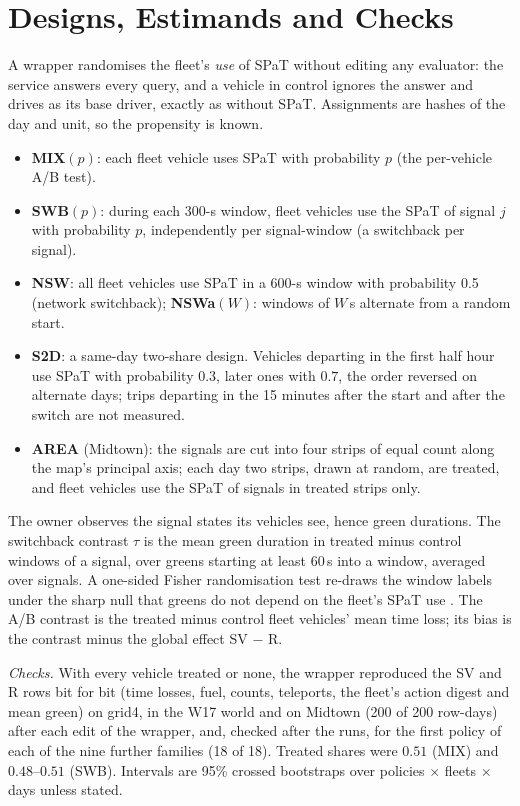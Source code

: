 \section{Designs, Estimands and Checks}\label{sec:design}
A wrapper randomises the fleet's \emph{use} of SPaT without editing any evaluator: the service answers every query, and a vehicle in
control ignores the answer and drives as its base driver, exactly as without SPaT. Assignments are hashes of the day and unit, so the
propensity is known.
\begin{itemize}\setlength\itemsep{1pt}
\item \textbf{MIX}$(p)$: each fleet vehicle uses SPaT with probability $p$ (the per-vehicle A/B test).
\item \textbf{SWB}$(p)$: during each 300-s window, fleet vehicles use the SPaT of signal $j$ with probability $p$, independently per
signal-window (a switchback per signal).
\item \textbf{NSW}: all fleet vehicles use SPaT in a 600-s window with probability 0.5 (network switchback); \textbf{NSWa}$(W)$: windows of
$W$\,s alternate from a random start.
\item \textbf{S2D}: a same-day two-share design. Vehicles departing in the first half hour use SPaT with probability $0.3$, later ones
with $0.7$, the order reversed on alternate days; trips departing in the 15 minutes after the start and after the switch are not measured.
\item \textbf{AREA} (Midtown): the signals are cut into four strips of equal count along the map's principal axis; each day two strips,
drawn at random, are treated, and fleet vehicles use the SPaT of signals in treated strips only.
\end{itemize}
The owner observes the signal states its vehicles see, hence green durations. The switchback contrast $\tau$ is the mean green
duration in treated minus control windows of a signal, over greens starting at least 60\,s into a window, averaged over signals.
A one-sided Fisher randomisation test re-draws the window labels under the sharp null that greens do not depend on the fleet's
SPaT use \cite{imbens2015}. The A/B contrast is the treated minus control fleet vehicles' mean time loss; its bias is the contrast
minus the global effect SV $-$ R.

\emph{Checks.} With every vehicle treated or none, the wrapper reproduced the SV and R rows bit for bit (time losses, fuel, counts,
teleports, the fleet's action digest and mean green) on grid4, in the W17 world and on Midtown (200 of 200 row-days) after each edit of
the wrapper, and, checked after the runs, for the first policy of each of the nine further families (18 of 18). Treated shares were
$0.51$ (MIX) and $0.48$--$0.51$ (SWB).
Intervals are 95\% crossed bootstraps over policies $\times$ fleets $\times$ days unless stated.

